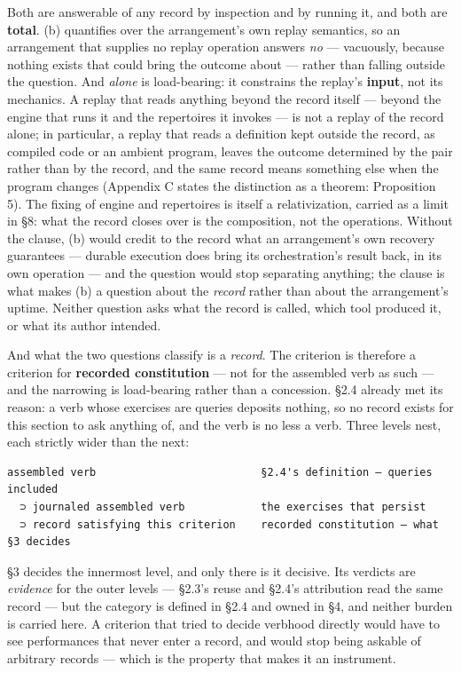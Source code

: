 \documentclass[
]{article}
\begin{document}
Both are answerable of any record by inspection and by running it, and
both are \textbf{total}. (b) quantifies over the arrangement's own
replay semantics, so an arrangement that supplies no replay operation
answers \emph{no} --- vacuously, because nothing exists that could bring
the outcome about --- rather than falling outside the question. And
\emph{alone} is load-bearing: it constrains the replay's \textbf{input},
not its mechanics. A replay that reads anything beyond the record itself
--- beyond the engine that runs it and the repertoires it invokes --- is
not a replay of the record alone; in particular, a replay that reads a
definition kept outside the record, as compiled code or an ambient
program, leaves the outcome determined by the pair rather than by the
record, and the same record means something else when the program
changes (Appendix C states the distinction as a theorem: Proposition 5).
The fixing of engine and repertoires is itself a relativization, carried
as a limit in §8: what the record closes over is the composition, not
the operations. Without the clause, (b) would credit to the record what
an arrangement's own recovery guarantees --- durable execution does
bring its orchestration's result back, in its own operation --- and the
question would stop separating anything; the clause is what makes (b) a
question about the \emph{record} rather than about the arrangement's
uptime. Neither question asks what the record is called, which tool
produced it, or what its author intended.

And what the two questions classify is a \emph{record}. The criterion is
therefore a criterion for \textbf{recorded constitution} --- not for the
assembled verb as such --- and the narrowing is load-bearing rather than
a concession. §2.4 already met its reason: a verb whose exercises are
queries deposits nothing, so no record exists for this section to ask
anything of, and the verb is no less a verb. Three levels nest, each
strictly wider than the next:

\begin{verbatim}
assembled verb                          §2.4's definition — queries included
  ⊃ journaled assembled verb            the exercises that persist
  ⊃ record satisfying this criterion    recorded constitution — what §3 decides
\end{verbatim}

§3 decides the innermost level, and only there is it decisive. Its
verdicts are \emph{evidence} for the outer levels --- §2.3's reuse and
§2.4's attribution read the same record --- but the category is defined
in §2.4 and owned in §4, and neither burden is carried here. A criterion
that tried to decide verbhood directly would have to see performances
that never enter a record, and would stop being askable of arbitrary
records --- which is the property that makes it an instrument.
\end{document}
